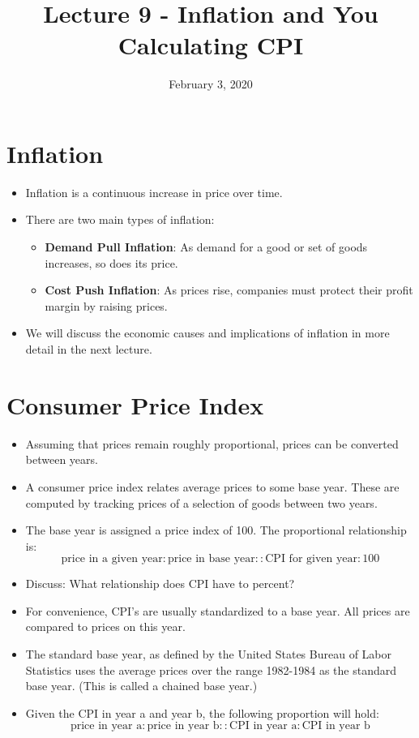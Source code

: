 \documentclass{article}
\title{Lecture 9 - Inflation and You Calculating CPI}
\author{}
\date{February 3, 2020}
\begin{document}
\maketitle
\section*{Inflation}
\begin{itemize}
\item Inflation is a continuous increase in price over time.
\item There are two main types of inflation:
    \begin{itemize}
    \item {\bf Demand Pull Inflation}: As demand for a good or set of goods increases, 
       so does its price.
    \item {\bf Cost Push Inflation}: As prices rise, companies must protect their profit
       margin by raising prices.
    \end{itemize}
\item We will discuss the economic causes and implications of inflation in more detail 
  in the next lecture.
\end{itemize}

\section*{Consumer Price Index}
\begin{itemize}
\item Assuming that prices remain roughly proportional, prices can be converted between years.
\item A consumer price index relates average prices to some base year.  These are computed by tracking prices of a selection of goods between two years.
\item The base year is assigned a price index of 100.  The proportional relationship is:
\[
\textrm{price in a given year} : \textrm{price in base year} :: \textrm{CPI for given year} : 100 
\]
\item Discuss:  What relationship does CPI have to percent?
\item For convenience, CPI's are usually standardized to a base year.  All prices are compared to prices on this year.
\item The standard base year, as defined by the United States Bureau of Labor Statistics uses the average prices over the range 1982-1984 as the standard base year.  (This is called a chained base year.)
\item Given the CPI in year a and year b, the following proportion will hold:
\[
\textrm{price in year a} : \textrm{price in year b} :: \textrm{CPI in year a} : \textrm{CPI in year b}
\]
\end{itemize}
\end{document}
